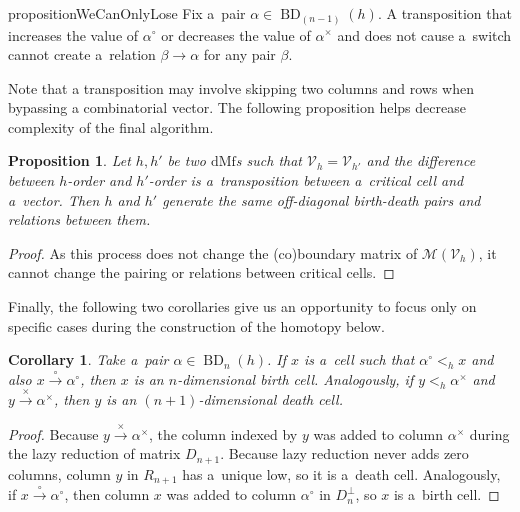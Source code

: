 \documentclass[a4paper,12pt, USenglish,cleveref,autoref,thm-restate]{article}
\newtheorem{corollary}[theorem]{Corollary}
\newtheorem{proposition}[theorem]{Proposition}
\newcommand{\mf}{h}
\newcommand{\omf}{h'}
\DeclareMathOperator{\bd}{BD}
\newcommand{\dmf}{\text{dMf}}
\newcommand{\hmB}{D}
\newcommand{\cmB}{D^{\perp}}
\newcommand{\hmR}{R}
\newcommand{\cx}{x}
\newcommand{\cy}{y}
\newcommand{\bth}[1]{#1^\circ}
\newcommand{\dth}[1]{#1^{\!\times}}
\newcommand{\homo}{\xrightarrow{\times}}
\newcommand{\rel}{\rightarrow}
\newcommand{\cohomo}{\xrightarrow{\circ}}
\newcommand{\bds}{\alpha}
\newcommand{\bdt}{\beta}
\newcommand{\cV}{\mathcal{V}}
\newcommand{\cM}{\mathcal{M}}
\begin{document}
\begin{restatable}{proposition}{WeCanOnlyLose}\label{prop:we_can_only_lose}
    Fix a~pair $\bds \in \bd_{(n-1)}(\mf)$. 
    A transposition that increases the value of $\bth\bds$  or decreases the value of $\dth\bds$ and does not cause a~switch cannot create a~relation $\bdt \rel \bds$ for any pair $\bdt$.
\end{restatable}

\noindent Note that a transposition may involve skipping two columns and rows when bypassing a combinatorial vector. The following proposition helps decrease complexity of the final algorithm.

\begin{proposition} \label{prop:vectors_not_create_critical_relations}
    Let $\mf, \omf$ be two $\dmf$s such that $\cV_{\mf} = \cV_{\omf}$ and the difference between $\mf$-order and $\omf$-order is a~transposition between a~critical cell and a~vector. Then $\mf$ and $\omf$ generate the same off-diagonal birth-death pairs and relations between them.
\end{proposition}

\begin{proof}
    As this process does not change the (co)boundary matrix of $\cM(\cV_{\mf})$, it cannot change the pairing or relations between critical cells.
\end{proof}

\noindent Finally, the following two corollaries give us an opportunity to focus only on specific cases during the construction of the homotopy below.

\begin{corollary}\label{cor:bd_pairs}
    Take a~pair $\bds \in \bd_{n}(\mf)$.  If $\cx$ is a~cell such that $\bth\bds <_{\mf} \cx$ and also $\cx \cohomo \bth\bds$, then $\cx$ is an $n$-dimensional birth cell. Analogously, if $\cy <_{\mf} \dth\bds$ and $\cy\homo\dth\bds$, then $\cy$ is an $(n+1)$-dimensional death cell.
    
    
    

\end{corollary}

\begin{proof}
    Because $\cy \homo \dth\bds$, the column indexed by $\cy$ was added to column $\dth\bds$ during the lazy reduction of matrix $\hmB_{n+1}$. Because lazy reduction never adds zero columns, column $\cy$ in $\hmR_{n+1}$ has a~unique low, so it is a~death cell. Analogously, if $\cx \cohomo \bth\bds$, then column $\cx$ was added to column $\bth\bds$ in $\cmB_{n}$, so $\cx$ is a~birth cell.
\end{proof}
\end{document}
